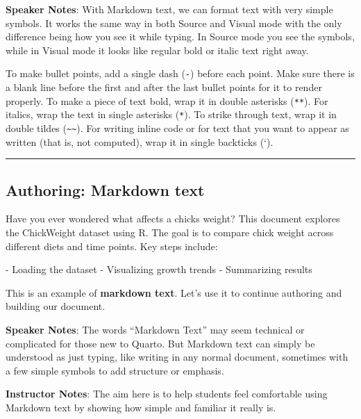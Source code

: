 \documentclass[
  letterpaper,
  DIV=11,
  numbers=noendperiod]{scrartcl}
\newenvironment{Shaded}{\begin{snugshade}}{\end{snugshade}}
\newcommand{\NormalTok}[1]{\textcolor[rgb]{0.00,0.23,0.31}{#1}}
\begin{document}
\textbf{Speaker Notes}: With Markdown text, we can format text with very
simple symbols. It works the same way in both Source and Visual mode
with the only difference being how you see it while typing. In Source
mode you see the symbols, while in Visual mode it looks like regular
bold or italic text right away.

To make bullet points, add a single dash (\texttt{-}) before each point.
Make sure there is a blank line before the first and after the last
bullet points for it to render properly. To make a piece of text bold,
wrap it in double asterisks (\texttt{**}). For italics, wrap the text in
single asterisks (\texttt{*}). To strike through text, wrap it in double
tildes (\texttt{\textasciitilde{}\textasciitilde{}}). For writing inline
code or for text that you want to appear as written (that is, not
computed), wrap it in single backticks (`).

\begin{center}\rule{0.5\linewidth}{0.5pt}\end{center}

\subsection{Authoring: Markdown text}\label{authoring-markdown-text}

\begin{Shaded}
\begin{Highlighting}[]
\NormalTok{Have you ever wondered what affects a chick\textquotesingle{}s weight? }
\NormalTok{This document explores the ChickWeight dataset using R.  }
\NormalTok{The goal is to compare chick weight across different diets and time points.  }
\NormalTok{Key steps include:}

\NormalTok{{-} Loading the dataset  }
\NormalTok{{-} Visualizing growth trends  }
\NormalTok{{-} Summarizing results}
\end{Highlighting}
\end{Shaded}

This is an example of \textbf{markdown text}. Let's use it to continue
authoring and building our document.

\textbf{Speaker Notes}: The words ``Markdown Text'' may seem technical
or complicated for those new to Quarto. But Markdown text can simply be
understood as just typing, like writing in any normal document,
sometimes with a few simple symbols to add structure or emphasis.

\textbf{Instructor Notes}: The aim here is to help students feel
comfortable using Markdown text by showing how simple and familiar it
really is.
\end{document}

